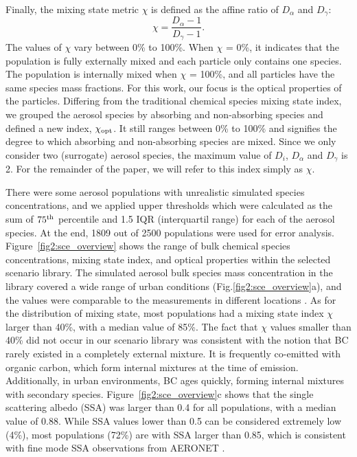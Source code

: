 \documentclass[edeposit,fullpage]{uiucthesis2009}
\begin{document}
Finally, the mixing state metric $\chi$ is defined as the affine ratio
of $D_\alpha$ and $D_\gamma$:
\begin{equation}
\chi = \frac{D_\alpha - 1}{D_\gamma - 1}.
\end{equation}
The values of $\chi$ vary between 0\% to 100\%. When $\chi$ = 0\%, it
indicates that the population is fully externally mixed and each
particle only contains one species. The population is internally mixed
when $\chi$ = 100\%, and all particles have the same species mass
fractions.  For this work, our focus is the optical properties of the
particles. Differing from the traditional chemical species mixing
state index, we grouped the aerosol species by absorbing and
non-absorbing species and defined a new index, $\chi_{\rm opt}$. It
still ranges between 0\% to 100\% and signifies the degree to which
absorbing and non-absorbing species are mixed. Since we only consider
two (surrogate) aerosol species, the maximum value of $D_i$,
$D_\alpha$ and $D_\gamma$ is 2. For the remainder of the paper, we
will refer to this index simply as $\chi$.

There were some aerosol populations with unrealistic simulated species concentrations, 
and we applied upper thresholds which were calculated as the sum of $\rm 75^{th}$ percentile 
and 1.5 IQR (interquartil range) for each of the aerosol species. 
At the end, 1809 out of 2500 populations were used for error analysis. 
Figure~\ref{fig2:sce_overview} shows the range of bulk chemical
species concentrations, mixing state index, and optical properties
within the selected scenario library. The simulated aerosol bulk species mass
concentration in the library covered a wide range of urban conditions
(Fig.\ref{fig2:sce_overview}a), and the values were comparable to the
measurements in different locations \citep{jimenez2009evolution,lanz2010characterization}. As for the
distribution of mixing state, most populations had a mixing state
index $\chi$ larger than 40\%, with a median value of 85\%.
The fact that $\chi$ values smaller than 40\% did not occur
in our scenario library was consistent with the notion that BC rarely
existed in a completely external mixture. It is frequently co-emitted
with organic carbon, which form internal mixtures at the time of
emission. Additionally, in urban environments, BC ages quickly,
forming internal mixtures with secondary species.
Figure~\ref{fig2:sce_overview}c shows that the single scattering
albedo (SSA) was larger than 0.4 for all populations, with a median
value of 0.88. While SSA values lower than 0.5 can be considered
extremely low (4\%), most populations (72\%) are with SSA larger than
0.85, which is consistent with fine mode SSA observations from AERONET
\citep{levy2007global}.
\end{document}
